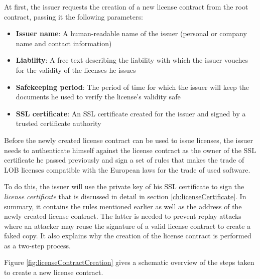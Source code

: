 \documentclass[a4paper]{article}
\begin{document}
At first, the issuer requests the creation of a new license contract from the root contract, passing it the following parameters:

\begin{itemize}
  \item \textbf{Issuer name}: A human-readable name of the issuer (personal or company name and contact information)
  \item \textbf{Liability}: A free text describing the liability with which the issuer vouches for the validity of the licenses he issues
  \item \textbf{Safekeeping period}: The period of time for which the issuer will keep the documents he used to verify the license's validity safe
  \item \textbf{SSL certificate}: An SSL certificate created for the issuer and signed by a trusted certificate authority
\end{itemize}

Before the newly created license contract can be used to issue licenses, the issuer needs to authenticate himself against the license contract as the owner of the SSL certificate he passed previously and sign a set of rules that makes the trade of LOB licenses compatible with the European laws for the trade of used software.

To do this, the issuer will use the private key of his SSL certificate to sign the \emph{license certificate} that is discussed in detail in section \ref{ch:licenseCertificate}. In summary, it contains the rules mentioned earlier as well as the address of the newly created license contract. The latter is needed to prevent replay attacks where an attacker may reuse the signature of a valid license contract to create a faked copy. It also explains why the creation of the license contract is performed as a two-step process.

Figure \ref{fig:licenseContractCreation} gives a schematic overview of the steps taken to create a new license contract.
\end{document}
